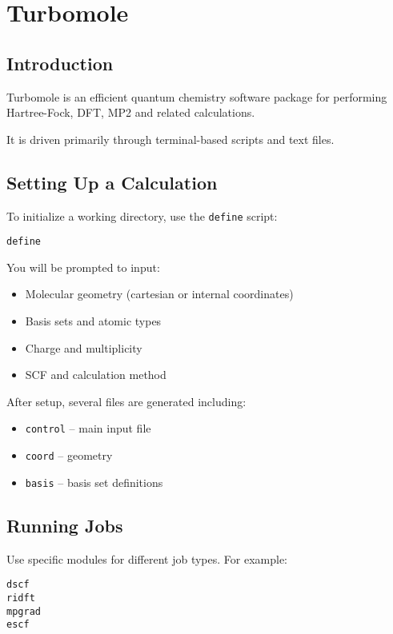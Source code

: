 \chapter{Turbomole}

\section{Introduction}

Turbomole is an efficient quantum chemistry software package for performing Hartree-Fock, DFT, MP2 and related calculations.

It is driven primarily through terminal-based scripts and text files.

\section{Setting Up a Calculation}

To initialize a working directory, use the \texttt{define} script:

\begin{verbatim}
define
\end{verbatim}

You will be prompted to input:
\begin{itemize}
    \item Molecular geometry (cartesian or internal coordinates)
    \item Basis sets and atomic types
    \item Charge and multiplicity
    \item SCF and calculation method
\end{itemize}

After setup, several files are generated including:
\begin{itemize}
    \item \texttt{control} – main input file
    \item \texttt{coord} – geometry
    \item \texttt{basis} – basis set definitions
\end{itemize}

\section{Running Jobs}

Use specific modules for different job types. For example:

\begin{verbatim}
dscf
ridft
mpgrad
escf
\end{verbatim}

